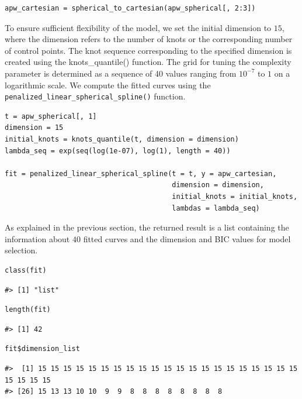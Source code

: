 \begin{verbatim}
apw_cartesian = spherical_to_cartesian(apw_spherical[, 2:3])
\end{verbatim}

To ensure sufficient flexibility of the model, we set the initial dimension to \(15\), where the dimension refers to the number of knots or the corresponding number of control points. The knot sequence corresponding to the specified dimension is created using the knots\_quantile() function. The grid for tuning the complexity parameter is determined as a sequence of 40 values ranging from \(10^{-7}\) to \(1\) on a logarithmic scale. We compute the fitted curves using the \texttt{penalized\_linear\_spherical\_spline()} function.

\begin{verbatim}
t = apw_spherical[, 1]
dimension = 15
initial_knots = knots_quantile(t, dimension = dimension)
lambda_seq = exp(seq(log(1e-07), log(1), length = 40))

fit = penalized_linear_spherical_spline(t = t, y = apw_cartesian,
                                        dimension = dimension,
                                        initial_knots = initial_knots,
                                        lambdas = lambda_seq)
\end{verbatim}

As explained in the previous section, the returned result is a list containing the information about \(40\) fitted curves and the dimension and BIC values for model selection.

\begin{verbatim}
class(fit)
\end{verbatim}

\begin{verbatim}
#> [1] "list"
\end{verbatim}

\begin{verbatim}
length(fit)
\end{verbatim}

\begin{verbatim}
#> [1] 42
\end{verbatim}

\begin{verbatim}
fit$dimension_list
\end{verbatim}

\begin{verbatim}
#>  [1] 15 15 15 15 15 15 15 15 15 15 15 15 15 15 15 15 15 15 15 15 15 15 15 15 15
#> [26] 15 13 13 10 10  9  9  8  8  8  8  8  8  8  8
\end{verbatim}

